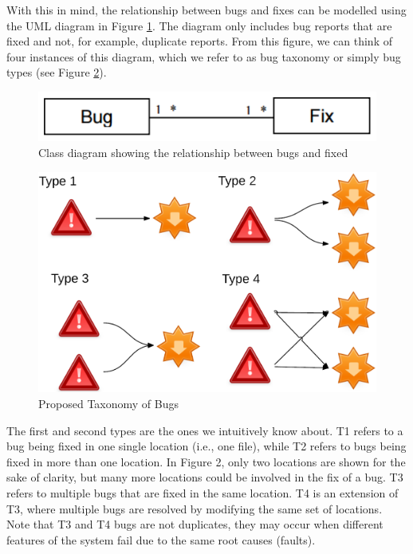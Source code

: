 \documentclass[12pt]{report}
\begin{document}
With this in mind, the relationship between bugs and fixes can be
modelled using the UML diagram in Figure \ref{fig:bug-taxo-diag}. The
diagram only includes bug reports that are fixed and not, for example,
duplicate reports. From this figure, we can think of four instances of
this diagram, which we refer to as bug taxonomy or simply bug types (see
Figure \ref{fig:bug-taxo}).

\begin{figure}[h!]
  \centering
    \includegraphics[scale=0.5]{media/chap9/bug-taxo-class-diag.png}
    \caption{Class diagram showing the relationship between bugs and fixed
    \label{fig:bug-taxo-diag}}
\end{figure}

\begin{figure}[h!]
  \centering
    \includegraphics[scale=0.6]{media/chap9/bug-taxo.png}
    \caption{Proposed Taxonomy of Bugs
    \label{fig:bug-taxo}}
\end{figure}

The first and second types are the ones we intuitively know about. T1
refers to a bug being fixed in one single location (i.e., one file),
while T2 refers to bugs being fixed in more than one location. In Figure
2, only two locations are shown for the sake of clarity, but many more
locations could be involved in the fix of a bug. T3 refers to multiple
bugs that are fixed in the same location. T4 is an extension of T3,
where multiple bugs are resolved by modifying the same set of locations.
Note that T3 and T4 bugs are not duplicates, they may occur when
different features of the system fail due to the same root causes
(faults).
\end{document}
